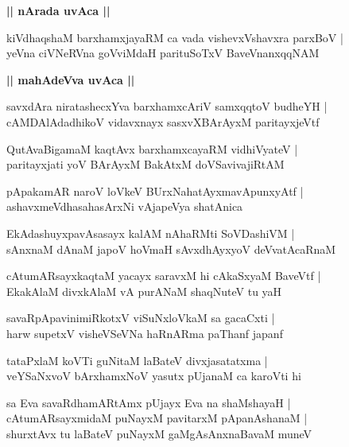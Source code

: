 \documentclass[twoside,12pt,openright]{book}
\newcounter{shloka}[chapter]
\def\uvaca#1{\centerline{{\large\textbf{#1}}}}
\begin{document}
\uvaca{|| nArada uvAca ||}

\begin{shloka}%
kiVdhaqshaM barxhamxjayaRM ca vada vishevxVshavxra parxBoV |\\
yeVna ciVNeRVna goVviMdaH parituSoTxV BaveVnanxqqNAM 
\end{shloka}

\uvaca{|| mahAdeVva uvAca ||}

\begin{shloka}%
savxdAra niratashecxYva barxhamxcAriV samxqqtoV budheYH |\\
cAMDAlAdadhikoV vidavxnayx sasxvXBArAyxM paritayxjeVtf
\end{shloka}

\begin{shloka}%
QutAvaBigamaM kaqtAvx barxhamxcayaRM vidhiVyateV |\\
paritayxjati yoV BArAyxM BakAtxM doVSavivajiRtAM 
\end{shloka}

\begin{shloka}%
pApakamAR naroV loVkeV BUrxNahatAyxmavApunxyAtf |\\
ashavxmeVdhasahasArxNi vAjapeVya shatAnica 
\end{shloka}

\begin{shloka}%
EkAdashuyxpavAsasayx kalAM nAhaRMti SoVDashiVM |\\
sAnxnaM dAnaM japoV hoVmaH sAvxdhAyxyoV deVvatAcaRnaM
\end{shloka}

\begin{shloka}%
cAtumARsayxkaqtaM yacayx saravxM hi cAkaSxyaM BaveVtf |\\
EkakAlaM divxkAlaM vA purANaM shaqNuteV tu yaH 
\end{shloka}

\begin{shloka}%
savaRpApavinimiRkotxV viSuNxloVkaM sa gacaCxti |\\
harw supetxV visheVSeVNa haRnARma paThanf japanf 
\end{shloka}

\begin{shloka}%
tataPxlaM koVTi guNitaM laBateV divxjasatatxma |\\
veYSaNxvoV bArxhamxNoV yasutx pUjanaM ca karoVti hi 
\end{shloka}

\begin{shloka}%
sa Eva savaRdhamARtAmx pUjayx Eva na shaMshayaH |\\
cAtumARsayxmidaM puNayxM pavitarxM pApanAshanaM |\\
shurxtAvx tu laBateV puNayxM gaMgAsAnxnaBavaM muneV 
\end{shloka}
\end{document}
